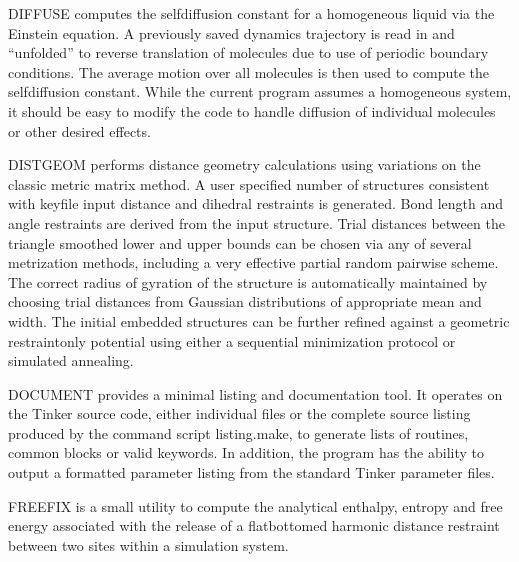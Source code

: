 \documentclass[letterpaper,11pt,english]{sphinxmanual}
\begin{document}
\sphinxAtStartPar
{}

\sphinxAtStartPar
DIFFUSE computes the self\sphinxhyphen{}diffusion constant for a homogeneous liquid via the Einstein equation. A previously saved dynamics trajectory is read in and “unfolded” to reverse translation of molecules due to use of periodic boundary conditions. The average motion over all molecules is then used to compute the self\sphinxhyphen{}diffusion constant. While the current program assumes a homogeneous system, it should be easy to modify the code to handle diffusion of individual molecules or other desired effects.

\sphinxAtStartPar
{}

\sphinxAtStartPar
DISTGEOM performs distance geometry calculations using variations on the classic metric matrix method. A user specified number of structures consistent with keyfile input distance and dihedral restraints is generated. Bond length and angle restraints are derived from the input structure. Trial distances between the triangle smoothed lower and upper bounds can be chosen via any of several metrization methods, including a very effective partial random pairwise scheme. The correct radius of gyration of the structure is automatically maintained by choosing trial distances from Gaussian distributions of appropriate mean and width. The initial embedded structures can be further refined against a geometric restraint\sphinxhyphen{}only potential using either a sequential minimization protocol or simulated annealing.

\sphinxAtStartPar
{}

\sphinxAtStartPar
DOCUMENT provides a minimal listing and documentation tool. It operates on the Tinker source code, either individual files or the complete source listing produced by the command script listing.make, to generate lists of routines, common blocks or valid keywords. In addition, the program has the ability to output a formatted parameter listing from the standard Tinker parameter files.

\sphinxAtStartPar
{}

\sphinxAtStartPar
FREEFIX is a small utility to compute the analytical enthalpy, entropy and free energy associated with the release of a flat\sphinxhyphen{}bottomed harmonic distance restraint between two sites within a simulation system.

\sphinxAtStartPar
{}
\end{document}
